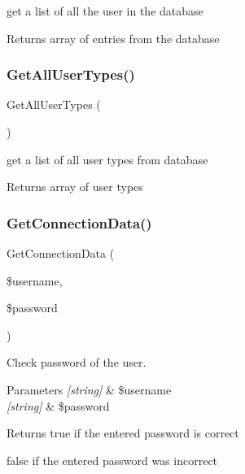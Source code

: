 get a list of all the user in the database 

\begin{DoxyReturn}{Returns}
array of entries from the database 
\end{DoxyReturn}
\mbox{\label{class_user_d_a_o_a14278a165514500ce608e1f6c96bc34c}} 
\subsubsection{\texorpdfstring{Get\+All\+User\+Types()}{GetAllUserTypes()}}
{\footnotesize\ttfamily Get\+All\+User\+Types (\begin{DoxyParamCaption}{ }\end{DoxyParamCaption})}



get a list of all user types from database 

\begin{DoxyReturn}{Returns}
array of user types 
\end{DoxyReturn}
\mbox{\label{class_user_d_a_o_ac1be310e4b7f4c0a3dd4f67a3e207e65}} 
\subsubsection{\texorpdfstring{Get\+Connection\+Data()}{GetConnectionData()}}
{\footnotesize\ttfamily Get\+Connection\+Data (\begin{DoxyParamCaption}\item[{}]{\$username,  }\item[{}]{\$password }\end{DoxyParamCaption})}



Check password of the user. 


\begin{DoxyParams}{Parameters}
{\em \mbox{[}string\mbox{]}} & \$username \\
\hline
{\em \mbox{[}string\mbox{]}} & \$password\\
\hline
\end{DoxyParams}
\begin{DoxyReturn}{Returns}
true if the entered password is correct 

false if the entered password was incorrect 
\end{DoxyReturn}
\mbox{\label{class_user_d_a_o_a482eedda3e26e4255ef3a1e01bb98c3e}} 
